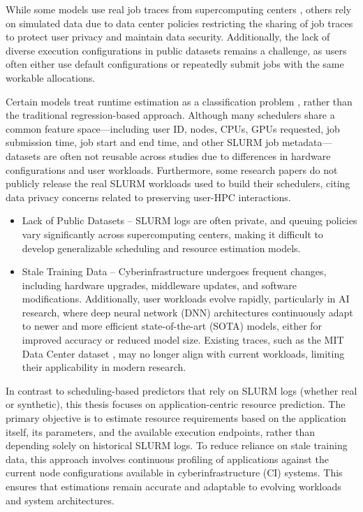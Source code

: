 {While some models use real job traces from supercomputing centers \cite{tanash2021ensemble, nakai2024node}, others rely on simulated data \cite{casanova2022feasibility, ohmura2022toward, ding2023mirage} due to data center policies restricting the sharing of job traces to protect user privacy and maintain data security. Additionally, the lack of diverse execution configurations in public datasets remains a challenge, as users often either use default configurations or repeatedly submit jobs with the same workable allocations.

Certain models treat runtime estimation as a classification problem \cite{reiner2016highly, klusavcek2024real}, rather than the traditional regression-based approach. Although many schedulers share a common feature space—including user ID, nodes, CPUs, GPUs requested, job submission time, job start and end time, and other SLURM job metadata—datasets are often not reusable across studies due to differences in hardware configurations and user workloads. Furthermore, some research papers do not publicly release the real SLURM workloads used to build their schedulers, citing data privacy concerns related to preserving user-HPC interactions.

\begin{itemize}
    \item Lack of Public Datasets – SLURM logs are often private, and queuing policies vary significantly across supercomputing centers, making it difficult to develop generalizable scheduling and resource estimation models.
    \item Stale Training Data – Cyberinfrastructure undergoes frequent changes, including hardware upgrades, middleware updates, and software modifications. Additionally, user workloads evolve rapidly, particularly in AI research, where deep neural network (DNN) architectures continuously adapt to newer and more efficient state-of-the-art (SOTA) models, either for improved accuracy or reduced model size. Existing traces, such as the MIT Data Center dataset \cite{fallon2013stata}, may no longer align with current workloads, limiting their applicability in modern research.
\end{itemize}

In contrast to scheduling-based predictors that rely on SLURM logs (whether real or synthetic), this thesis focuses on application-centric resource prediction. The primary objective is to estimate resource requirements based on the application itself, its parameters, and the available execution endpoints, rather than depending solely on historical SLURM logs. To reduce reliance on stale training data, this approach involves continuous profiling of applications against the current node configurations available in cyberinfrastructure (CI) systems. This ensures that estimations remain accurate and adaptable to evolving workloads and system architectures.

}
